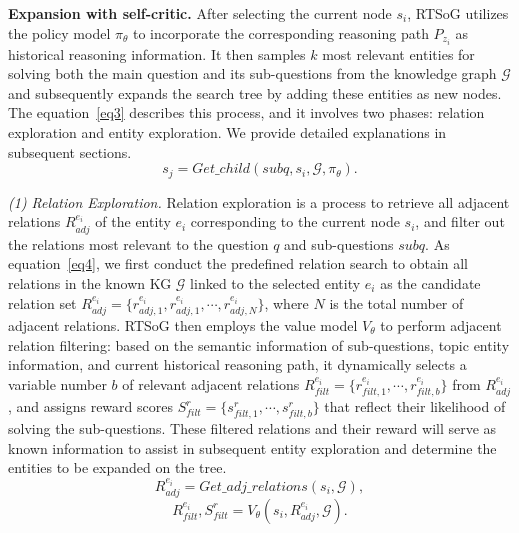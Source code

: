 \documentclass[lettersize,journal]{IEEEtran}
\begin{document}
\textbf{Expansion with self-critic.}
After selecting the current node $s_i$, RTSoG utilizes the policy model $\pi_{\theta}$ to incorporate the corresponding reasoning path $P_{z_i}$ as historical reasoning information. It then samples $k$ most relevant entities for solving both the main question and its sub-questions from the knowledge graph $\mathcal{G}$ and subsequently expands the search tree by adding these entities as new nodes. The equation~\ref{eq3} describes this process, and it involves two phases: relation exploration and entity exploration. We provide detailed explanations in subsequent sections.
\begin{equation}
    s_j=Get\_child(subq, s_{i}, \mathcal{G}, \pi_{\theta}).
    \label{eq3}
\end{equation}

\textit{(1) Relation Exploration.} Relation exploration is a process to retrieve all adjacent relations $R^{e_i}_{adj}$ of the entity $e_i$ corresponding to the current node $s_i$, and filter out the relations most relevant to the question $q$ and sub-questions $subq$. As equation~\ref{eq4}, we first conduct the predefined relation search to obtain all relations in the known KG $\mathcal{G}$ linked to the selected entity $e_i$ as the candidate relation set $R^{e_i}_{adj} = \{ r^{e_i}_{adj, 1}, r^{e_i}_{adj, 1}, \cdots, r^{e_i}_{adj, N} \}$, where $N$ is the total number of adjacent relations. RTSoG then employs the value model $V_{\theta}$ to perform adjacent relation filtering: based on the semantic information of sub-questions, topic entity information, and current historical reasoning path, it dynamically selects a variable number $b$ of relevant adjacent relations $R^{e_i}_{filt}=\{r^{e_i}_{filt, 1}, \cdots, r^{e_i}_{filt, b}\}$ from $R^{e_i}_{adj}$, and assigns reward scores $S^{r}_{filt}=\{s^{r}_{filt, 1}, \cdots, s^{r}_{filt, b} \}$ that reflect their likelihood of solving the sub-questions. These filtered relations and their reward will serve as known information to assist in subsequent entity exploration and determine the entities to be expanded on the tree.
\begin{equation}
    R^{e_i}_{adj}=Get\_adj\_relations(s_{i}, \mathcal{G}),
    \label{eq4}
\end{equation}
\begin{equation}
    R^{e_i}_{filt}, S^{r}_{filt} = V_{\theta}(s_{i}, R^{e_i}_{adj}, \mathcal{G}).
    \label{eq5}
\end{equation}
\end{document}
